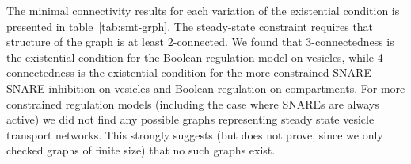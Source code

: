 


The minimal connectivity results for each variation of the existential condition is presented in table~\ref{tab:smt-grph}.
%
The steady-state constraint requires that structure of the graph is at least 2-connected. 
%
We found that 3-connectedness is the existential condition for the Boolean regulation model on vesicles, while 4-connectedness is the existential condition for the more constrained SNARE-SNARE inhibition on vesicles and Boolean regulation on compartments.
%
For more constrained regulation models
(including the case where SNAREs are always active) we did not find any possible graphs
representing steady state vesicle transport networks. 
%
This strongly suggests (but does not
prove, since we only checked graphs of finite size) that no such graphs exist.


